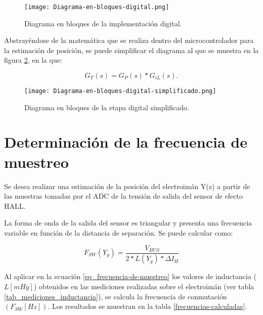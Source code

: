 \begin{figure}[H]
	\centering
	\texttt{[image: Diagrama-en-bloques-digital.png]}
	\caption{Diagrama en bloques de la implementación digital.}
	\label{fig:diag-en-bloques-digital}
\end{figure}

\noindent Abstrayéndose de la matemática que se realiza dentro del microcontrolador para la estimación de posición, se puede simplificar el diagrama al que se muestra en la figura \ref{fig:diag-en-bloques-digital-simplif}, en la que:

\begin{equation} 
	G_T(s) = G_P(s) * G_{iL}(s).
\end{equation}

\begin{figure}[H]
	\centering
	\texttt{[image: Diagrama-en-bloques-digital-simplificado.png]}
	\caption{Diagrama en bloques de la etapa digital simplificado.}
	\label{fig:diag-en-bloques-digital-simplif}
\end{figure}


\section{Determinación de la frecuencia de muestreo}

\noindent Se desea realizar una estimación de la posición del electroimán Y(z)  a partir de las muestras tomadas por el ADC de la tensión de salida del sensor de efecto HALL.

\noindent La forma de onda de la salida del sensor es triangular y presenta una frecuencia variable en función de la distancia de separación. Se puede calcular como:

\begin{equation} \label{eq_frecuencia-de-muestreo}
	F_{SW}(Y_g)=\frac{V_{BUS}}{2 * L(Y_g) * \Delta I_H}
\end{equation}



 Al aplicar en la ecuación \ref{eq_frecuencia-de-muestreo} los valores de inductancia ($L[mHy]$) obtenidos en las mediciones realizadas sobre el electroimán (ver tabla \ref{tab_mediciones_inductancia}), se calcula la frecuencia de conmutación  $(F_{SW}[Hz])$. Los resultados se muestran en la tabla \ref{frecuencias-calculadas}.



